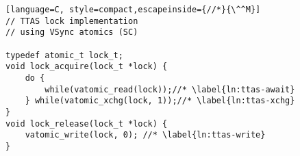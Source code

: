 \begin{lstlisting}[language=C, style=compact,escapeinside={//*}{\^^M}]
// TTAS lock implementation
// using VSync atomics (SC)

typedef atomic_t lock_t;
void lock_acquire(lock_t *lock) {
    do {
        while(vatomic_read(lock));//* \label{ln:ttas-await}
    } while(vatomic_xchg(lock, 1));//* \label{ln:ttas-xchg}
}
void lock_release(lock_t *lock) {
    vatomic_write(lock, 0); //* \label{ln:ttas-write}
}
\end{lstlisting}

